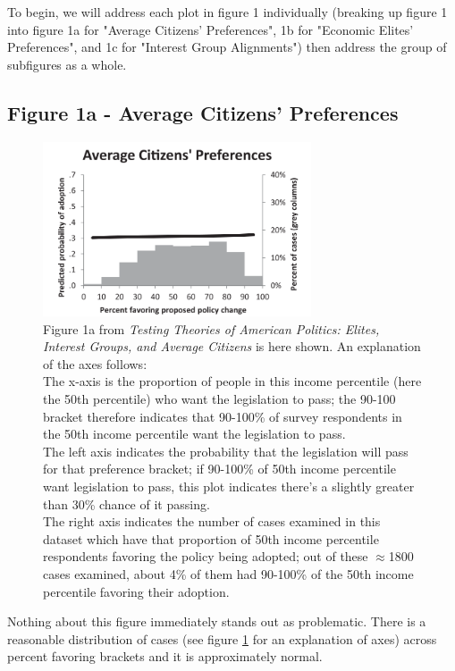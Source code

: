 \documentclass[]{article}
\begin{document}
To begin, we will address each plot in figure 1 individually (breaking up figure 1 into figure 1a for "Average Citizens' Preferences", 1b for "Economic Elites' Preferences", and 1c for "Interest Group Alignments") then address the group of subfigures as a whole.

\subsection{Figure 1a - Average Citizens' Preferences}
\begin{figure}[H]
	\begin{center}
		\includegraphics[width=300px]{./figures/paper/average-citizens-preferences.png}
	\end{center}	
	\caption{Figure 1a from \textit{Testing Theories of American Politics: Elites, Interest Groups, and Average Citizens} is here shown. An explanation of the axes follows: \\The x-axis is the proportion of people in this income percentile (here the 50th percentile) who want the legislation to pass; the 90-100 bracket therefore indicates that 90-100\% of survey respondents in the 50th income percentile want the legislation to pass. \\The left axis indicates the probability that the legislation will pass for that preference bracket; if 90-100\% of 50th income percentile want legislation to pass, this plot indicates there's a slightly greater than 30\% chance of it passing. \\The right axis indicates the number of cases examined in this dataset which have that proportion of 50th income percentile respondents favoring the policy being adopted; out of these $\approx$1800 cases examined, about 4\% of them had 90-100\% of the 50th income percentile favoring their adoption.}
	\label{paper_figure1a}
\end{figure}

Nothing about this figure immediately stands out as problematic. There is a reasonable distribution of cases (see figure \ref{paper_figure1a} for an explanation of axes) across percent favoring brackets and it is approximately normal.
\end{document}
